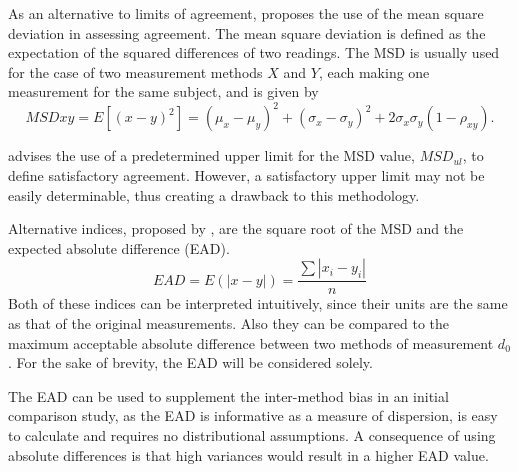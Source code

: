 \documentclass[12pt, a4paper]{report}
\theoremstyle{plain}
\theoremstyle{definition}
\theoremstyle{remark}
\begin{document}
As an alternative to limits of agreement, \citet{lin2002} proposes the use of
the mean square deviation in assessing agreement. The mean square
deviation is defined as the expectation of the squared differences
of two readings. The MSD is usually used for the case of two
measurement methods $X$ and $Y$, each making one measurement for
the same subject, and is given by
\[
MSDxy = E[(x - y)^2]  = (\mu_{x} - \mu_{y})^2 + (\sigma_{x} -
\sigma_{y})^2 + 2\sigma_{x}\sigma_{y}(1-\rho_{xy}).
\]


\citet{Barnhart} advises the use of a predetermined upper limit
for the MSD value, $MSD_{ul}$, to define satisfactory agreement.
However, a satisfactory upper limit may not be easily
determinable, thus creating a drawback to this methodology.


Alternative indices, proposed by \citet{Barnhart}, are the square root of the MSD and the expected absolute difference (EAD). 
\[
EAD = E(|x - y|) = \frac{\sum |x_{i}- y_{i}|}{n}
\]
Both of these indices can be interpreted intuitively, since their units are the same as that of the original measurements. Also they can be compared to the maximum acceptable absolute difference between two methods of measurement $d_{0}$. For the sake of brevity, the EAD will be considered solely.

The EAD can be used to supplement the inter-method bias in an
initial comparison study, as the EAD is informative as a measure
of dispersion, is easy to calculate and requires no distributional
assumptions. A consequence of using absolute differences is that high variances would result in a higher EAD value. 

\end{document}

